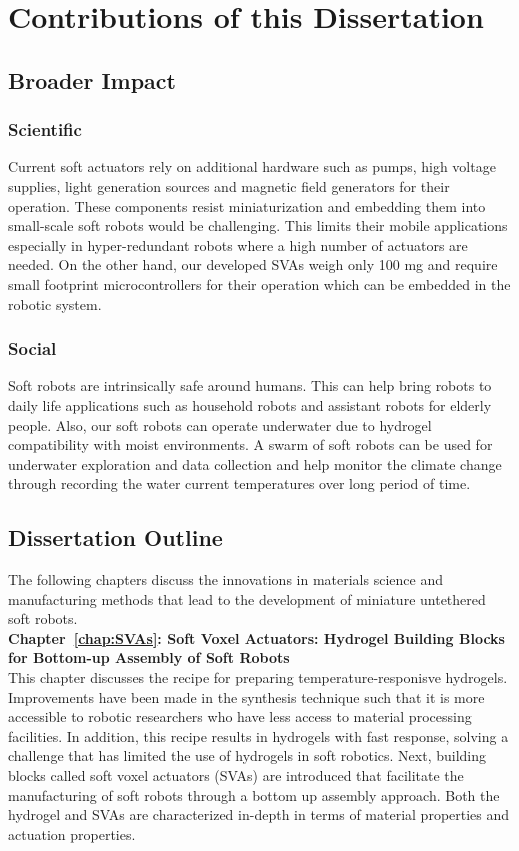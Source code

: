 \section{Contributions of this Dissertation}

\subsection{Broader Impact}
\subsubsection{Scientific}
Current soft actuators rely on additional hardware such as pumps, high voltage supplies, light generation sources and magnetic field generators for their operation. These components resist miniaturization and embedding them into small-scale soft robots would be challenging. This limits their mobile applications especially in hyper-redundant robots where a high number of actuators are needed. On the other hand, our developed SVAs weigh only 100 mg and require small footprint microcontrollers for their operation which can be embedded in the robotic system. 
\subsubsection{Social}
Soft robots are intrinsically safe around humans. This can help bring robots to daily life applications such as household robots and assistant robots for elderly people. Also, our soft robots can operate underwater due to hydrogel compatibility with moist environments. A swarm of soft robots can be used for underwater exploration and data collection and help monitor the climate change through recording the water current temperatures over long period of time.

\subsection{Dissertation Outline}
The following chapters discuss the innovations in materials science and manufacturing methods that lead to the development of miniature untethered soft robots.\\ 
\textbf{Chapter~\ref{chap:SVAs}: Soft Voxel Actuators: Hydrogel Building Blocks for Bottom-up Assembly of Soft Robots}\\
This chapter discusses the recipe for preparing temperature-responisve hydrogels. Improvements have been made in the synthesis technique such that it is more accessible to robotic researchers who have less access to material processing facilities. In addition, this recipe results in hydrogels with fast response, solving a challenge that has limited the use of hydrogels in soft robotics. Next, building blocks called soft voxel actuators (SVAs) are introduced that facilitate the manufacturing of soft robots through a bottom up assembly approach. Both the hydrogel and SVAs are characterized in-depth in terms of material properties and actuation properties.
  
